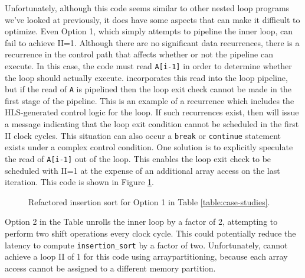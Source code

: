 Unfortunately, although this code seems similar to other nested loop programs we've looked at previously, it does have some aspects that can make it difficult to optimize.  Even Option 1, which simply attempts to pipeline the inner loop, can fail to achieve II=1.  Although there are no significant data recurrences, there is a recurrence in the control path that affects whether or not the pipeline can execute.  In this case, the code must read \lstinline{A[i-1]} in order to determine whether the loop should actually execute.  \VHLS incorporates this read into the loop pipeline, but if the read of \lstinline{A} is pipelined then the loop exit check cannot be made in the first stage of the pipeline.  This is an example of a recurrence which includes the HLS-generated control logic for the loop.  If such recurrences exist, then \VHLS will issue a message indicating that the loop exit condition cannot be scheduled in the first II clock cycles.  This situation can also occur a \lstinline{break} or \lstinline{continue} statement exists under a complex control condition.  One solution is to explicitly speculate the read of \lstinline{A[i-1]} out of the loop.  This enables the loop exit check to be scheduled with II=1 at the expense of an additional array access on the last iteration.  This code is shown in Figure \ref{fig:insertion_sort_relaxed.cpp}.

\begin{figure}

\caption{Refactored insertion sort for Option 1 in Table \ref{table:case-studies}.}
\label{fig:insertion_sort_relaxed.cpp}
\end{figure}

Option 2 in the Table unrolls the inner loop by a factor of 2, attempting to perform two shift operations every clock cycle.  This could potentially reduce the latency to compute \lstinline{insertion_sort} by a factor of two.  Unfortunately, \VHLS cannot achieve a loop II of 1 for this code using \gls{arraypartitioning}, because each array access cannot be assigned to a different memory partition.


